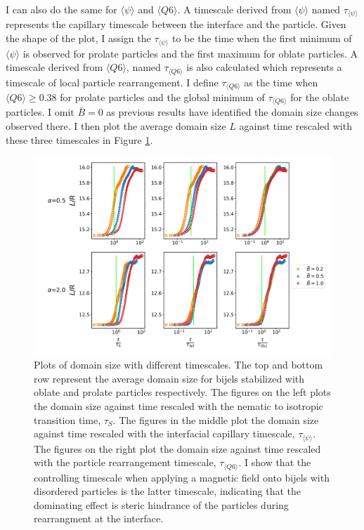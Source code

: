 I can also do the same for $\langle \psi \rangle$ and
$\langle Q6 \rangle$. A timescale derived from
$\langle \psi \rangle$ named $\tau_{\langle \psi \rangle}$
represents the capillary timescale between the interface and the
particle. Given the shape of the plot, I assign the
$\tau_{\langle \psi \rangle}$ to be the time when the first minimum of
$\langle \psi \rangle$ is observed for prolate particles and the first
maximum for oblate particles. A timescale derived from
$\langle Q6 \rangle$, named $\tau_{\langle Q6 \rangle}$ is also
calculated which represents a timescale of local particle rearrangement.
I define $\tau_{\langle Q6 \rangle}$ as the time when
\(\langle Q6 \rangle \geq 0.38\) for prolate particles and the global
minimum of $\tau_{\langle Q6 \rangle}$ for the oblate particles. I
omit \(\bar{B} = 0\) as previous results have identified the domain size
changes observed there. I then plot the average domain size $L$
against time rescaled with these three timescales in Figure
\ref{fig:domain_size-field_on-scaled}.

\begin{figure} 
\centering 
\includegraphics[scale=0.4]{../figures/results/paper2/domain_size-field_on-scaled.png} 
\caption{Plots of domain size with different timescales. The top and bottom row represent the average domain size for bijels stabilized with oblate and 
         prolate particles respectively. The figures on the left plots the domain size against time rescaled with the nematic to isotropic transition time, 
         $\tau_S$. The figures in the middle plot the domain size against time rescaled with the interfacial capillary timescale, $\tau_{\langle \psi \rangle}$. 
         The figures on the right plot the domain size against time rescaled with the particle rearrangement timescale, $\tau_{\langle Q6 \rangle}$. I show 
         that the controlling timescale when applying a magnetic field onto bijels with disordered particles is the latter timescale, indicating that the 
         dominating effect is steric hindrance of the particles during rearrangment at the interface.} 
\label{fig:domain_size-field_on-scaled} 
\end{figure}

